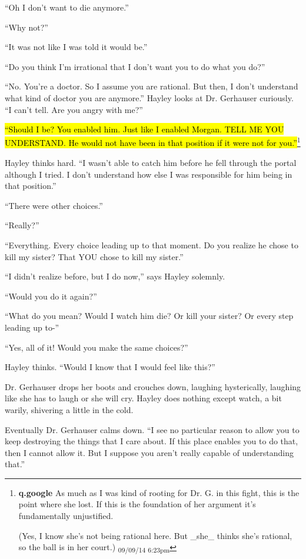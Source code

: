 ``Oh I don't want to die anymore.''

``Why not?''

``It was not like I was told it would be.''

``Do you think I'm irrational that I don't want you to do what you do?''

``No.  You're a doctor.  So I assume you are rational. But then, I don't understand what kind of doctor you are anymore.''  Hayley looks at Dr. Gerhauser curiously.  ``I can't tell.  Are you angry with me?''

\hl{``Should I be?  You enabled him.  Just like I enabled Morgan.  TELL ME YOU UNDERSTAND.  He would not have been in that position if it were not for you.''}\footnote{\textbf{q.google }As much as I was kind of rooting for Dr. G. in this fight, this is the point where she lost.  If this is the foundation of her argument it's fundamentally unjustified.

(Yes, I know she's not being rational here.  But \_she\_ thinks she's rational, so the ball is in her court.) \textsubscript{09/09/14 6:23pm}}

Hayley thinks hard.  ``I wasn't able to catch him before he fell through the portal although I tried.  I don't understand how else I was responsible for him being in that position.''

``There were other choices.''

``Really?''

``Everything.  Every choice leading up to that moment. Do you realize he chose to kill my sister?  That YOU chose to kill my sister.''

``I didn't realize before, but I do now,'' says Hayley solemnly.

``Would you do it again?''

``What do you mean?  Would I watch him die?  Or kill your sister?  Or every step leading up to-''

``Yes, all of it!  Would you make the same choices?''

Hayley thinks.  ``Would I know that I would feel like this?''

Dr. Gerhauser drops her boots and crouches down, laughing hysterically, laughing like she has to laugh or she will cry.  Hayley does nothing except watch, a bit warily, shivering a little in the cold.

Eventually Dr. Gerhauser calms down. ``I see no particular reason to allow you to keep destroying the things that I care about.  If this place enables you to do that, then I cannot allow it.  But I suppose you aren't really capable of understanding that.''

